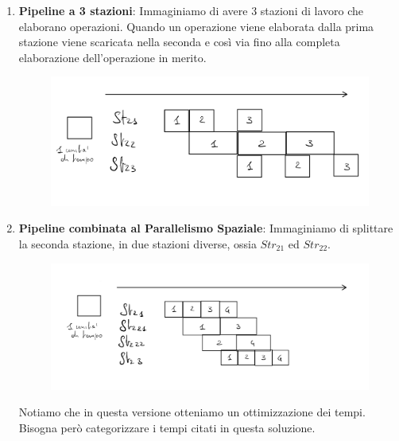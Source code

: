 \documentclass{article}
\begin{document}
\begin{enumerate}
\newpage

    \begin{enumerate}
        \item \textbf{Pipeline a 3 stazioni}: Immaginiamo di avere 3 stazioni di lavoro che elaborano operazioni. Quando un operazione viene elaborata dalla prima stazione viene scaricata nella seconda e così via fino alla completa elaborazione dell'operazione in merito.

        \begin{figure}[htbp]
            \center
            \includegraphics[scale=0.2]{img/Parall_Temporale.png}
        \end{figure}

        \item \textbf{Pipeline combinata al Parallelismo Spaziale}: Immaginiamo di splittare la seconda stazione, in due stazioni diverse, ossia $Str_{21}$ ed $Str_{22}$.

        \begin{figure}[htbp]
            \center
            \includegraphics[scale=0.2]{img/combo_tempo_spazio.png}
        \end{figure}

        Notiamo che in questa versione otteniamo un ottimizzazione dei tempi. Bisogna però categorizzare i tempi citati in questa soluzione.
        
    \end{enumerate}
    
\end{enumerate}
\end{document}
